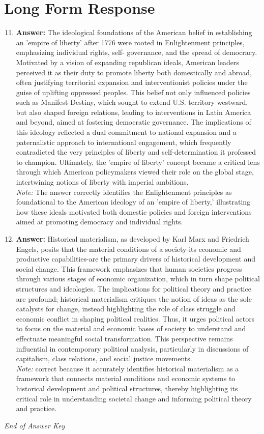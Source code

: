 \documentclass[12pt]{article}
\begin{document}
\section*{Long Form Response}
\begin{enumerate}[label=\arabic*.]
\setcounter{enumi}{10}
\item \textbf{Answer:} The ideological foundations of the American belief in establishing an 'empire of liberty' after 1776 were rooted in Enlightenment principles, emphasizing individual rights, self- governance, and the spread of democracy. Motivated by a vision of expanding republican ideals, American leaders perceived it as their duty to promote liberty both domestically and abroad, often justifying territorial expansion and interventionist policies under the guise of uplifting oppressed peoples. This belief not only influenced policies such as Manifest Destiny, which sought to extend U.S. territory westward, but also shaped foreign relations, leading to interventions in Latin America and beyond, aimed at fostering democratic governance. The implications of this ideology reflected a dual commitment to national expansion and a paternalistic approach to international engagement, which frequently contradicted the very principles of liberty and self-determination it professed to champion. Ultimately, the 'empire of liberty' concept became a critical lens through which American policymakers viewed their role on the global stage, intertwining notions of liberty with imperial ambitions.
\\ \textit{Note:} The answer correctly identifies the Enlightenment principles as foundational to the American ideology of an 'empire of liberty,' illustrating how these ideals motivated both domestic policies and foreign interventions aimed at promoting democracy and individual rights.
\item \textbf{Answer:} Historical materialism, as developed by Karl Marx and Friedrich Engels, posits that the material conditions of a society-its economic and productive capabilities-are the primary drivers of historical development and social change. This framework emphasizes that human societies progress through various stages of economic organization, which in turn shape political structures and ideologies. The implications for political theory and practice are profound; historical materialism critiques the notion of ideas as the sole catalysts for change, instead highlighting the role of class struggle and economic conflict in shaping political realities. Thus, it urges political actors to focus on the material and economic bases of society to understand and effectuate meaningful social transformation. This perspective remains influential in contemporary political analysis, particularly in discussions of capitalism, class relations, and social justice movements.
\\ \textit{Note:} correct because it accurately identifies historical materialism as a framework that connects material conditions and economic systems to historical development and political structures, thereby highlighting its critical role in understanding societal change and informing political theory and practice.
\end{enumerate}

\vfill
\noindent\textit{End of Answer Key}
\end{document}
